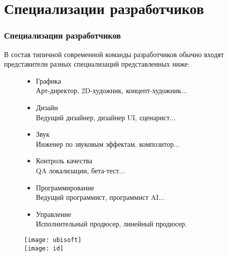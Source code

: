 \section{Специализации разработчиков}
\begin{frame}
    \frametitle{Специализации разработчиков}
    В состав типичной современной команды разработчиков обычно входят представители разных 
    специализаций представленных ниже:
    \begin{figure}
        \begin{minipage}{0.55\textwidth}
            \begin{itemize}
                \item Графика\\
                    \tiny Арт-директор, 2D-художник, концепт-художник...
                \item \normalsize Дизайн\\
                    \tiny Ведущий дизайнер, дизайнер UI, сценарист...
                \item \normalsize Звук\\
                    \tiny Инженер по звуковым эффектам, композитор...
                \item \normalsize Контроль качества\\
                    \tiny QA локализации, бета-тест...
                \item \normalsize Программирование\\
                    \tiny Ведущий программист, программист AI...
                \item \normalsize Управление\\
                    \tiny Исполнительный продюсер, линейный продюсер.
            \end{itemize}
        \end{minipage}
        \begin{minipage}{0.40\textwidth}
            \texttt{[image: ubisoft]}\\
            \texttt{[image: id]}
        \end{minipage}
    \end{figure}
\end{frame}

